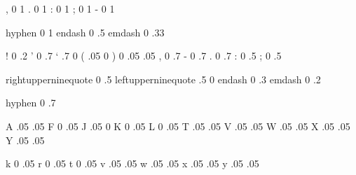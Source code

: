 

\startfonthandling [pure]

   , 0 1
   . 0 1
   : 0 1
   ; 0 1
   - 0 1

   hyphen 0 1
   endash 0 .5
   emdash 0 .33 %

\stopfonthandling

\startfonthandling [punctuation]

   !  0  .2
   '  0  .7
   ` .7   0
   ( .05  0
   )  0  .05
    .05
   ,  0  .7
   -  0  .7
   .  0  .7
   :  0  .5
   ;  0  .5

   rightupperninequote  0 .5
   leftupperninequote  .5  0
   endash               0 .3
   emdash               0 .2

   hyphen               0 .7

\stopfonthandling

\startfonthandling [alpha]

   A .05 .05
   F  0  .05
   J .05   0
   K  0  .05
   L  0  .05
   T .05 .05
   V .05 .05
   W .05 .05
   X .05 .05
   Y .05 .05

   k  0  .05
   r  0  .05
   t  0  .05
   v .05 .05
   w .05 .05
   x .05 .05
   y .05 .05

